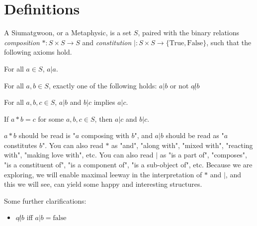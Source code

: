 \section{Definitions}




\begin{definition}[Siumatgwoon]\label{def:siumatgwoon}
    A Siumatgwoon, or a Metaphysic, is a set $S$, paired with the binary relations \textit{composition} $* : S \times S \rightarrow S$ and \textit{constitution} $|:S\times S \rightarrow \{\text{True}, \text{False}\}$, such that the following axioms hold. 

    \begin{axiom}[Reflexivity]\label{ax:reflex}
    For all $a \in S$, $a|a$.
    \end{axiom}

    \begin{axiom}[Totality]\label{ax:total}
    For all $a,b\in S$, exactly one of the following holds: $a|b$ or not $a\not|b$
    \end{axiom}

    \begin{axiom}[Transitivity]\label{ax:trans}
    For all $a,b,c\in S$, $a|b$ and $b|c$ implies $a|c$.
    \end{axiom}

    \begin{axiom}\label{ax:comp-const}
    If $a*b=c$ for some $a,b,c\in S$, then $a|c$ and $b|c$.
    \end{axiom}
\end{definition}

$a * b$ should be read is "$a$ composing with $b$", and $a | b$ should be read as "$a$ constitutes $b$". You can also read $*$ as "and", "along with", "mixed with", "reacting with", "making love with", etc. You can also read $|$ as "is a part of", "composes", "is a constituent of", "is a component of", "is a sub-object of", etc. Because we are exploring, we will enable maximal leeway in the interpretation of $*$ and $|$, and this we will see, can yield some happy and interesting structures. 

Some further clarifications: 

\begin{itemize}
\item $a\not|b$ iff $a|b = \text{false}$
\end{itemize}

